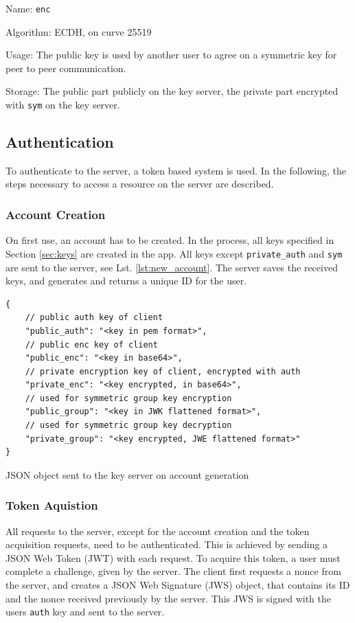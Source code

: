\documentclass[a4paper, oneside]{discothesis}
\begin{document}
Name: \texttt{enc}

\noindent
Algorithm: ECDH, on curve 25519

\noindent
Usage: The public key is used by another user to agree on a symmetric key for peer to peer communication.

\noindent
Storage: The public part publicly on the key server, the private part encrypted with \texttt{sym} on the key server.

\subsection{Authentication}

To authenticate to the server, a token based system is used. In the following, the steps necessary to access a resource on the server are described.

\subsubsection{Account Creation}

On first use, an account has to be created. In the process, all keys specified in Section \ref{sec:keys} are created in the app. All keys except \texttt{private\_auth} and \texttt{sym} are sent to the server, see Lst. \ref{lst:new_account}. The server saves the received keys, and generates and returns a unique ID for the user.

\begin{listing}[h!]
\begin{verbatim}
{
    // public auth key of client
    "public_auth": "<key in pem format>",
    // public enc key of client
    "public_enc": "<key in base64>",
    // private encryption key of client, encrypted with auth
    "private_enc": "<key encrypted, in base64>",
    // used for symmetric group key encryption
    "public_group": "<key in JWK flattened format>",
    // used for symmetric group key decryption
    "private_group": "<key encrypted, JWE flattened format>" 
}
\end{verbatim}
\caption{JSON object sent to the key server on account generation}
\label{lst:new_account}
\end{listing}

\subsubsection{Token Aquistion}

All requests to the server, except for the account creation and the token acquisition requests, need to be authenticated. This is achieved by sending a JSON Web Token (JWT) with each request. To acquire this token, a user must complete a challenge, given by the server. The client first requests a nonce from the server, and creates a JSON Web Signature (JWS) object, that contains its ID and the nonce received previously by the server. This JWS is signed with the users \texttt{auth} key and sent to the server.
\end{document}
